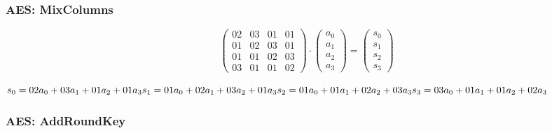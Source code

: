\documentclass[12pt]{beamer}
\begin{document}
\begin{frame}
\frametitle{AES: MixColumns}
 
\[ \left( \begin{array}{cccc}
02 & 03 & 01 & 01 \\
01 & 02 & 03 & 01 \\
01 & 01 & 02 & 03 \\
03 & 01 & 01 & 02\end{array} \right)
\cdot
\left( \begin{array}{c}
a_0 \\
a_1 \\
a_2 \\
a_3\end{array} \right)
=
\left( \begin{array}{c}
s_0 \\
s_1 \\
s_2 \\
s_3\end{array} \right)
\]

\pause

\begin{center}
$
s_0 = {02}a_0+{03}a_1+{01}a_2+{01}a_3 \\
s_1 = {01}a_0+{02}a_1+{03}a_2+{01}a_3 \\
s_2 = {01}a_0+{01}a_1+{02}a_2+{03}a_3 \\
s_3 = {03}a_0+{01}a_1+{01}a_2+{02}a_3 \\
$
\end{center}

\end{frame}


\begin{frame}
\frametitle{AES: AddRoundKey}
\end{frame}
\end{document}
